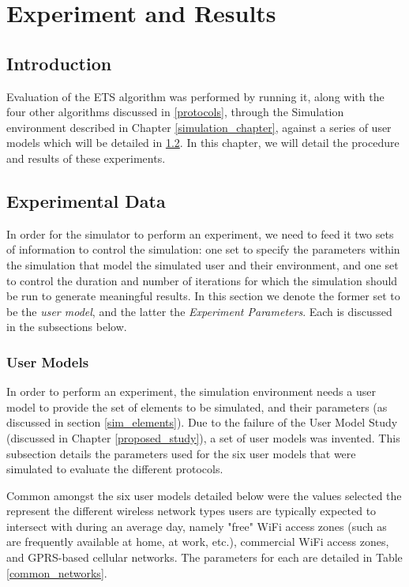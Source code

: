 \chapter{Experiment and Results} \label{results_chapter}

\section{Introduction}  

Evaluation of the ETS algorithm was performed by running it, along with the four other algorithms discussed in \ref{protocols}, through the Simulation environment described in Chapter \ref{simulation_chapter}, against a series of user models which will be detailed in \ref{user_profile_data}.  In this chapter, we will detail the procedure and results of these experiments.

\section{Experimental Data}\label{user_profile_data}

In order for the simulator to perform an experiment, we need to feed it two sets of information to control the simulation:  one set to specify the parameters within the simulation that model the simulated user and their environment, and one set to control the duration and number of iterations for which the simulation should be run to generate meaningful results.  In this section we denote the former set to be the \emph{user model}, and the latter the \emph{Experiment Parameters}.  Each is discussed in the subsections below.

\subsection{User Models}

In order to perform an experiment, the simulation environment needs a user model to provide the set of elements to be simulated, and their parameters (as discussed in section \ref{sim_elements}).  Due to the failure of the User Model Study (discussed in Chapter \ref{proposed_study}), a set of user models was invented.  This subsection details the parameters used for the six user models that were simulated to evaluate the different protocols.

Common amongst the six user models detailed below were the values selected the represent the different wireless network types users are typically expected to intersect with during an average day, namely "free" WiFi access zones (such as are frequently available at home, at work, etc.), commercial WiFi access zones, and GPRS-based cellular networks.  The parameters for each are detailed in Table \ref{common_networks}.

